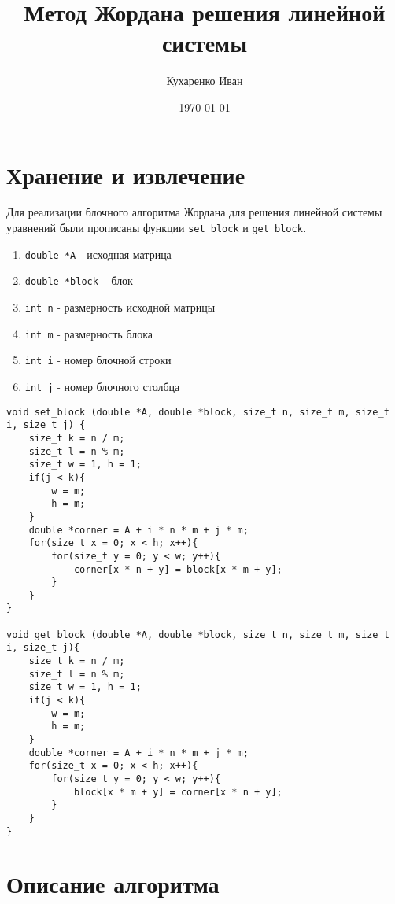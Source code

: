 \documentclass[a4paper,12pt]{article}
\begin{document}
\author{Кухаренко Иван}
\title {Метод Жордана решения линейной системы}
\date{\today}
\maketitle

\section{Хранение и извлечение}

Для реализации блочного алгоритма Жордана для решения линейной системы уравнений были прописаны функции \texttt{set\_block} и \texttt{get\_block}.

\begin{enumerate}
    \item \texttt{double *A} - исходная матрица
    \item \texttt{double *block }- блок
    \item \texttt{int n} - размерность исходной матрицы
    \item \texttt{int m} - размерность блока
    \item \texttt{int i} - номер блочной строки
    \item \texttt{int j} - номер блочного столбца
\end{enumerate}

\begin{verbatim}
void set_block (double *A, double *block, size_t n, size_t m, size_t i, size_t j) {
    size_t k = n / m;
    size_t l = n % m;
    size_t w = 1, h = 1;
    if(j < k){
        w = m;
        h = m;
    }
    double *corner = A + i * n * m + j * m;
    for(size_t x = 0; x < h; x++){
        for(size_t y = 0; y < w; y++){
            corner[x * n + y] = block[x * m + y];
        }
    }
}

void get_block (double *A, double *block, size_t n, size_t m, size_t i, size_t j){
    size_t k = n / m;
    size_t l = n % m;
    size_t w = 1, h = 1;
    if(j < k){
        w = m;
        h = m;
    }
    double *corner = A + i * n * m + j * m;
    for(size_t x = 0; x < h; x++){
        for(size_t y = 0; y < w; y++){
            block[x * m + y] = corner[x * n + y];
        }
    }
}

\end{verbatim}

\section{Описание алгоритма}
\end{document}
